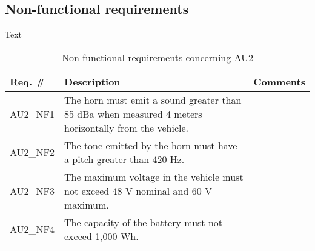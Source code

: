 \subsection{Non-functional requirements}
Text

\begin{table}[h!]
	\centering
	\label{my-label}
	\begin{tabular}{|p{2 cm}|p{7 cm}|p{4 cm}|}
		\hline
		\textbf{Req. \#} & \textbf{Description} & \textbf{Comments} \\\hline
		AU2\_NF1	& The horn must emit a sound greater than 85 dBa when measured 4 meters horizontally from the vehicle. &	\\\hline
		AU2\_NF2	& The tone emitted by the horn must have a pitch greater than 420 Hz. &	\\\hline
		AU2\_NF3	& The maximum voltage in the vehicle must not exceed 48 V nominal and 60 V maximum. &	\\\hline
		AU2\_NF4	& The capacity of the battery must not exceed 1,000 Wh. &	\\\hline
	\end{tabular}
	\caption{Non-functional requirements concerning AU2}
\end{table}